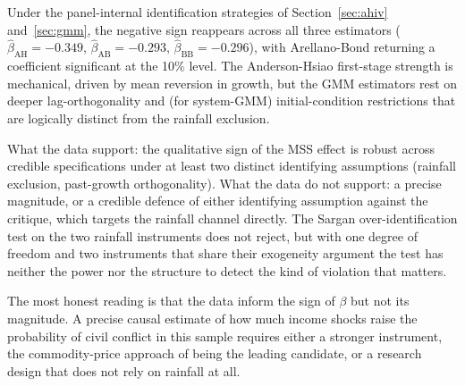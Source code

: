 \documentclass[11pt,a4paper]{article}
\begin{document}
Under the panel-internal identification strategies of
Section~\ref{sec:ahiv} and~\ref{sec:gmm}, the negative sign reappears
across all three estimators ($\hat\beta_{\text{AH}} = -0.349$,
$\hat\beta_{\text{AB}} = -0.293$, $\hat\beta_{\text{BB}} = -0.296$),
with Arellano-Bond returning a coefficient significant at the 10\%
level. The Anderson-Hsiao first-stage strength is mechanical, driven
by mean reversion in growth, but the GMM estimators rest on deeper
lag-orthogonality and (for system-GMM) initial-condition restrictions
that are logically distinct from the rainfall exclusion.

What the data support: the qualitative sign of the MSS effect is
robust across credible specifications under at least two distinct
identifying assumptions (rainfall exclusion, past-growth
orthogonality). What the data do not support: a precise magnitude, or
a credible defence of either identifying assumption against the
\citet{Sarsons2015} critique, which targets the rainfall channel
directly. The Sargan over-identification test on the two rainfall
instruments does not reject, but with one degree of freedom and two
instruments that share their exogeneity argument the test has neither
the power nor the structure to detect the kind of violation that
matters.

The most honest reading is that the data inform the sign of $\beta$
but not its magnitude. A precise causal estimate of how much income
shocks raise the probability of civil conflict in this sample requires
either a stronger instrument, the commodity-price approach of
\citet{BrucknerCiccone2010} being the leading candidate, or a research
design that does not rely on rainfall at all.
\end{document}
